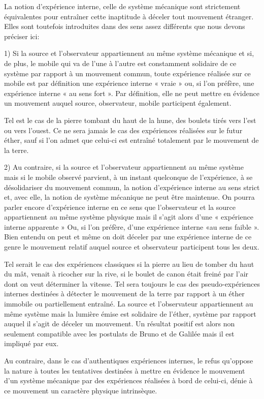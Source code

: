 La notion d’expérience interne, celle de système mécanique sont
strictement équivalentes pour entraîner cette inaptitude à déceler tout
mouvement étranger. Elles sont toutefois introduites dans des sens assez
différents que nous devons préciser ici:

1) Si la source et l’observateur appartiennent au même système
mécanique et si, de plus, le mobile qui va de l’une à l’autre est constamment
solidaire de ce système par rapport à un mouvement commun,
toute expérience réalisée sur ce mobile est par définition une expérience
interne « vraie » ou, si l’on préfère, une expérience interne « au sens
fort ». Par définition, elle ne peut mettre en évidence un mouvement
auquel source, observateur, mobile participent également.

Tel est le cas de la pierre tombant du haut de la hune, des boulets
tirés vers l’est ou vers l’ouest. Ce ne sera jamais le cas des expériences
réalisées sur le futur éther, sauf si l’on admet que celui-ci est entraîné
totalement par le mouvement de la terre.

2) Au contraire, si la source et l’observateur appartiennent au même
système mais si le mobile observé parvient, à un instant quelconque de
l’expérience, à se désolidariser du mouvement commun, la notion d’expérience
interne au sens strict et, avec elle, la notion de système mécanique
ne peut être maintenue. On pourra parler encore d’expérience interne
en ce sens que l’observateur et la source appartiennent au même système
physique mais il s’agit alors d’une « expérience interne apparente » Ou,
si l’on préfère, d’une expérience interne «au sens faible ». Bien entendu
on peut et même on doit déceler par une expérience interne de ce genre
le mouvement relatif auquel source et observateur participent tous les
deux.

Tel serait le cas des expériences classiques si la pierre au lieu de tomber
du haut du mât, venait à ricocher sur la rive, si le boulet de canon
était freiné par l’air dont on veut déterminer la vitesse. Tel sera toujours
le cas des pseudo-expériences internes destinées à détecter le mouvement
de la terre par rapport à un éther immobile ou partiellement entraîné.
La source et l’observateur appartiennent au même système mais la
lumière émise est solidaire de l’éther, système par rapport auquel il s’agit
de déceler un mouvement. Un résultat positif est alors non seulement
compatible avec les postulats de Bruno et de Galilée mais il est impliqué
par eux.

Au contraire, dans le cas d’authentiques expériences internes, le
refus qu’oppose la nature à toutes les tentatives destinées à mettre en
évidence le mouvement d’un système mécanique par des expériences
réalisées à bord de celui-ci, dénie à ce mouvement un caractère physique
intrinsèque.

